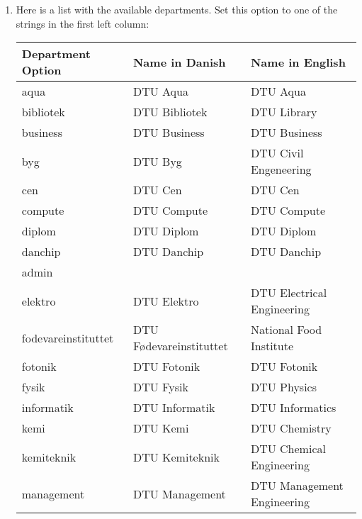 \documentclass{article}
\begin{document}
\begin{enumerate}
                Given the new background {\color{blue}backgroundMyPic.png}, the option background should be set to:
                \begin{lstlisting}[name=code,firstnumber=2]
\usetheme[department=elektro, language=english, background=MyPic]{DTU}
                \end{lstlisting}
                
                \pagebreak
                \item Here is a list with the available departments. Set this option to one of the strings in the first left column:
                
                \begin{table}[H]
                \centering
                \begin{tabular}{lll}
                        Department Option&Name in Danish&Name in English\\\hline\hline
                        aqua&DTU Aqua&DTU Aqua\\
                        bibliotek&DTU Bibliotek&DTU Library\\
                        business&DTU Business&DTU Business\\
                        byg&DTU Byg&DTU Civil Engeneering\\
                        cen&DTU Cen&DTU Cen\\
                        compute&DTU Compute&DTU Compute\\
                        diplom&DTU Diplom&DTU Diplom\\
                        danchip&DTU Danchip&DTU Danchip\\
                        admin&&\\
                        elektro&DTU Elektro&DTU Electrical Engineering\\
                        fodevareinstituttet&DTU F\o devareinstituttet&National Food Institute\\
                        fotonik&DTU Fotonik&DTU Fotonik\\
                        fysik&DTU Fysik&DTU Physics\\
                        informatik&DTU Informatik&DTU Informatics\\
                        kemi&DTU Kemi&DTU Chemistry\\
                        kemiteknik&DTU Kemiteknik&DTU Chemical Engineering\\
                        management&DTU Management&DTU Management Engineering\\

\end{tabular}
\end{table}
\end{enumerate}
\end{document}
